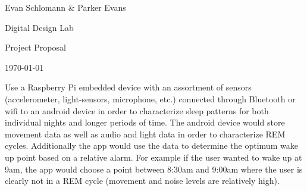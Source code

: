 \documentclass{article}
\begin{document}
\hfill Evan Schlomann \& Parker Evans

\hfill Digital Design Lab

\hfill Project Proposal

\hfill \today \\

\vspace{1cm}


\bigskip

Use a Raspberry Pi embedded device with an assortment of sensors (accelerometer, light-sensors, microphone, etc.) connected through Bluetooth or wifi to an android device in order to characterize sleep patterns for both individual nights and longer periods of time. The android device would store movement data as well as audio and light data in order to characterize REM cycles. Additionally the app would use the data to determine the optimum wake up point based on a relative alarm. For example if the user wanted to wake up at 9am, the app would choose a point between 8:30am and 9:00am where the user is clearly not in a REM cycle (movement and noise levels are relatively high). 
\end{document}
